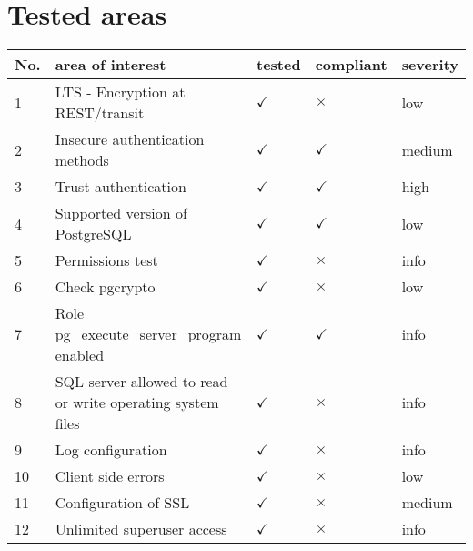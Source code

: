 
        \section{Tested areas}
        \begin{center}
        \begin{tabular}{ | m{1cm} | m{15em} | m{1.5cm} | m{1.7cm} | m{1.5cm}|}
            \hline
            \textbf{No.} & \textbf{area of interest} & \textbf{tested} & \textbf{compliant} &\textbf{severity}\\
            \hline
            1 & LTS - Encryption at REST/transit & $\checkmark$ & $\times$ & low \\\hline
    2 & Insecure authentication methods & $\checkmark$ & $\checkmark$ & medium \\\hline
    3 & Trust authentication & $\checkmark$ & $\checkmark$ & high \\\hline
    4 & Supported version of PostgreSQL & $\checkmark$ & $\checkmark$ & low \\\hline
    5 & Permissions test & $\checkmark$ & $\times$ & info \\\hline
    6 & Check pgcrypto & $\checkmark$ & $\times$ & low \\\hline
    7 & Role pg\_execute\_server\_program enabled & $\checkmark$ & $\checkmark$ & info \\\hline
    8 & SQL server allowed to read or write operating system files & $\checkmark$ & $\times$ & info \\\hline
    9 & Log configuration & $\checkmark$ & $\times$ & info \\\hline
    10 & Client side errors & $\checkmark$ & $\times$ & low \\\hline
    11 & Configuration of SSL & $\checkmark$ & $\times$ & medium \\\hline
    12 & Unlimited superuser access & $\checkmark$ & $\times$ & info \\\hline

        \end{tabular}
        \end{center}
        